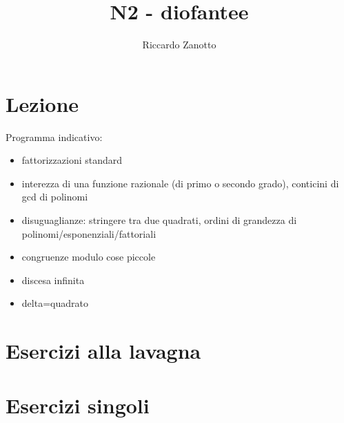 \documentclass[12pt]{article}
\author{Riccardo Zanotto}
\title{N2 - diofantee}
\begin{document}
\maketitle


\section{Lezione}

Programma indicativo:

\begin{itemize}
    \item fattorizzazioni standard
    \item interezza di una funzione razionale (di primo o secondo grado), conticini di gcd di polinomi
    \item disuguaglianze: stringere tra due quadrati, ordini di grandezza di polinomi/esponenziali/fattoriali
    \item congruenze modulo cose piccole
    \item discesa infinita
    \item delta=quadrato
\end{itemize}

\section{Esercizi alla lavagna}

\section{Esercizi singoli}
\end{document}
